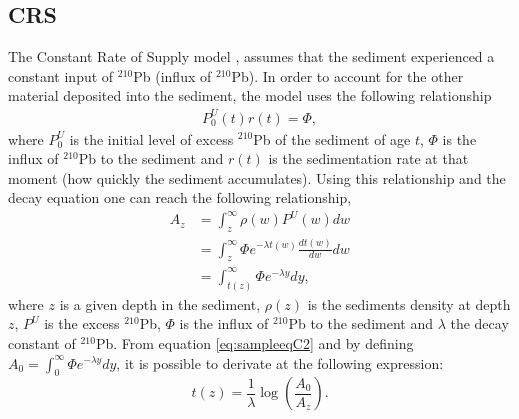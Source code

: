 \documentclass [10pt] {article}
\begin{document}



\subsection{CRS}


The Constant Rate of Supply model \citep{Appleby1978,Appleby1998,Appleby2001,Appleby2008}, assumes that the sediment experienced a constant input of $^{210}$Pb (influx of $^{210}$Pb). In order to account for the other material deposited into the sediment, the model uses the following relationship
\begin{eqnarray}
	P_0^U(t)r(t) = \Phi,
\end{eqnarray}
where $P_0^U$ is the initial level of excess $^{210}$Pb of the sediment of age $t$, $\Phi$ is the influx of $^{210}$Pb to the sediment and $r(t)$ is the sedimentation rate at that moment (how quickly the sediment accumulates). Using this relationship and the decay equation one can reach the following relationship, 
\begin{eqnarray}
	A_{z}&=\int_{z}^{\infty}\rho(w)P^U(w)dw  \nonumber \\
	&=\int_{z}^{\infty} \Phi e^{- \lambda t(w) }\frac{dt(w)}{dw} dw \nonumber \\ 
	&=\int_{t(z)}^{\infty} \Phi e^{- \lambda y } dy,  \label{eq:sampleeqC2} 
\end{eqnarray}
where $z$ is a given depth in the sediment, $\rho(z)$ is the sediments density at depth $z$, $P^U$ is the excess $^{210}$Pb, $\Phi$ is the influx of $^{210}$Pb to the sediment and $\lambda$ the decay constant of $^{210}$Pb. From equation \ref{eq:sampleeqC2} and by defining $A_0=\int_{0}^{\infty} \Phi e^{- \lambda y } dy$, it is possible to derivate at the following expression:
\begin{equation}
	t(z)= \frac{1}{\lambda}\log\left(\frac{A_0}{A_{z}}\right). \label{eq:CRS}
\end{equation}
\end{document}
